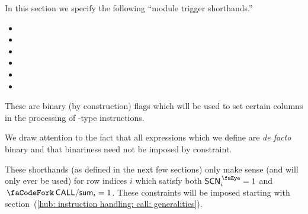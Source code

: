 In this section we specify the following ``module trigger shorthands.''
\begin{multicols}{2}
\begin{itemize}
	\item \locCallTriggersMxp{}
	\item \locCallTriggersTrm{}
	\item \locCallTriggersStp{}
	\item \locCallTriggersOob{}
	\item \locCallTriggersRomLex{}
	\item[\vspace{\fill}]
\end{itemize}
\end{multicols}
\noindent These are binary (by construction) flags which will be used to set certain columns in the processing of -type instructions.

\saNote{} We draw attention to the fact that all  expressions which we define are \emph{de facto} binary and that binariness need not be imposed by constraint.

\saNote{} These shorthands (as defined in the next few sections) only make sense (and will only ever be used) for row indices $i$ which satisfy both $\peekScenario_{i} = 1$ and $\scenCallSum_{i} = 1$. These constraints will be imposed starting with section~(\ref{hub: instruction handling: call: generalities}).
